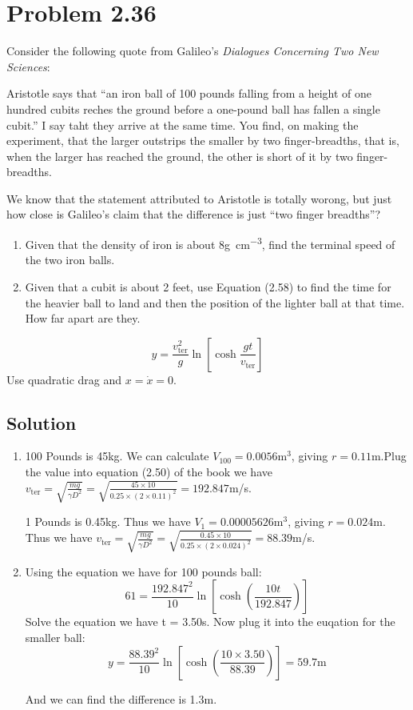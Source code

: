 \documentclass[aps,prl,reprint]{revtex4-1}
\begin{document}


\section{Problem 2.36}
Consider the following quote from Galileo's \textit{Dialogues Concerning Two New Sciences}:

Aristotle says that ``an iron ball of 100 pounds falling from a height of one hundred cubits reches the ground before a one-pound ball has fallen a single cubit.'' I say taht they arrive at the same time. You find, on making the experiment, that the larger outstrips the smaller by two finger-breadths, that is, when the larger has reached the ground, the other is short of it by two finger-breadths.

We know that the statement attributed to Aristotle is totally worong, but just how close is Galileo's claim that the difference is just ``two finger breadths''?
\begin{enumerate}
    \item Given that the density of iron is about 8\si{\gram\per\centi\metre\cubed}, find the terminal speed of the two iron balls.
    \item Given that a cubit is about 2 feet, use Equation (2.58) to find the time for the heavier ball to land and then the position of the lighter ball at that time. How far apart are they.
\end{enumerate}
\[
y = \frac{v_{\text{ter}}^2}{g} \ln\left[\cosh\frac{gt}{v_{\text{ter}}}\right]
\]
Use quadratic drag and $x = \dot{x}=0$.
\subsection{Solution}
\begin{enumerate}
    \item 100 Pounds is 45kg. We can calculate $V_{100} = 0.0056$m$^3$, giving $r = 0.11$m.Plug the value into equation (2.50) of the book we have $v_\text{ter} = \sqrt{\frac{mg}{\gamma D^2}} = \sqrt{\frac{45\times 10}{0.25\times (2 \times 0.11)^2}} = 192.847$m/s.

    1 Pounds is 0.45kg. Thus we have $V_1 = 0.00005626$m$^3$, giving $r = 0.024$m. Thus we have $v_\text{ter} = \sqrt{\frac{mg}{\gamma D^2}} = \sqrt{\frac{0.45\times 10}{0.25\times (2\times0.024)^2}} = 88.39$m/s.
    \item Using the equation we have for 100 pounds ball:
    \[
        61 = \frac{192.847^2}{10} \ln[\cosh (\frac{10 t}{192.847})]
    \]
    Solve the equation we have t = 3.50s. Now plug it into the euqation for the smaller ball:
    \[
        y = \frac{88.39^2}{10} \ln[\cosh (\frac{10 \times 3.50}{88.39})] = 59.7\mathrm{m}
    \]

    And we can find the difference is 1.3m.
\end{enumerate}
\end{document}
